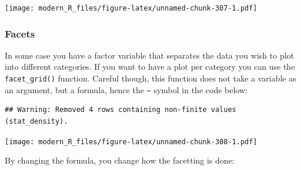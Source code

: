 \documentclass[]{gitbook}
\newenvironment{Shaded}{\begin{snugshade}}{\end{snugshade}}
\newcommand{\CommentTok}[1]{\textcolor[rgb]{0.56,0.35,0.01}{\textit{#1}}}
\newcommand{\DataTypeTok}[1]{\textcolor[rgb]{0.13,0.29,0.53}{#1}}
\newcommand{\KeywordTok}[1]{\textcolor[rgb]{0.13,0.29,0.53}{\textbf{#1}}}
\newcommand{\NormalTok}[1]{#1}
\newcommand{\OperatorTok}[1]{\textcolor[rgb]{0.81,0.36,0.00}{\textbf{#1}}}
\newcommand{\StringTok}[1]{\textcolor[rgb]{0.31,0.60,0.02}{#1}}
\theoremstyle{definition}
\theoremstyle{definition}
\theoremstyle{definition}
\theoremstyle{remark}
\begin{document}
\texttt{[image: modern\_R\_files/figure-latex/unnamed-chunk-307-1.pdf]}

\hypertarget{facets}{%
\subsubsection{Facets}\label{facets}}

In some case you have a factor variable that separates the data you wish
to plot into different categories. If you want to have a plot per
category you can use the \texttt{facet\_grid()} function. Careful
though, this function does not take a variable as an argument, but a
formula, hence the \texttt{\textasciitilde{}} symbol in the code below:

\begin{Shaded}
\end{Shaded}

\begin{verbatim}
## Warning: Removed 4 rows containing non-finite values (stat_density).
\end{verbatim}

\texttt{[image: modern\_R\_files/figure-latex/unnamed-chunk-308-1.pdf]}

By changing the formula, you change how the facetting is done:
\end{document}
